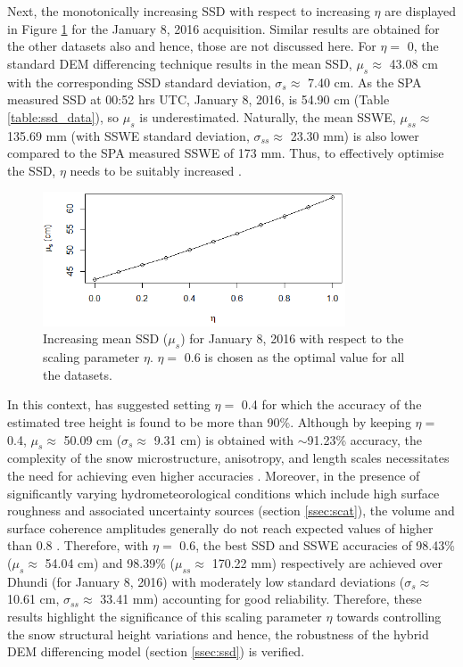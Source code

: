 \documentclass[12pt]{elsarticle}
\numberwithin{equation}{section}
\numberwithin{figure}{section}
\numberwithin{table}{section}
\begin{document}
Next, the monotonically increasing SSD with respect to increasing $\eta$ are displayed in Figure \ref{fig:eta} for the January 8, 2016 acquisition. Similar results are obtained for the other datasets also and hence, those are not discussed here. For $\eta =$ 0, the standard DEM differencing technique \citep{Cloude2005} results in the mean SSD, $\mu_s \approx$ 43.08 cm with the corresponding SSD standard deviation, $\sigma_s \approx$ 7.40 cm. As the SPA measured SSD at 00:52 hrs UTC, January 8, 2016, is 54.90 cm (Table \ref{table:ssd_data}), so $\mu_s$ is underestimated. Naturally, the mean SSWE, $\mu_{ss} \approx$ 135.69 mm (with SSWE standard deviation, $\sigma_{ss} \approx$ 23.30 mm) is also lower compared to the SPA measured SSWE of 173 mm. Thus, to effectively optimise the SSD, $\eta$ needs to be suitably increased \citep{Cloude2005, Cloude2010}.

\begin{figure}[htb]
    \centering
    \includegraphics[width=0.8\textwidth]{Figures/Results/Eta.png}
    \caption{\doublespacing Increasing mean SSD ($\mu_s$) for January 8, 2016 with respect to the scaling parameter $\eta$. $\eta =$ 0.6 is chosen as the optimal value for all the datasets.}
    \label{fig:eta}
\end{figure}

In this context, \cite{Cloude2005} has suggested setting $\eta = $ 0.4 for which the accuracy of the estimated tree height is found to be more than 90\%. Although by keeping $\eta = $ 0.4, $\mu_s \approx$ 50.09 cm ($\sigma_s \approx$ 9.31 cm) is obtained with $\sim$91.23\% accuracy, the complexity of the snow microstructure, anisotropy, and length scales necessitates the need for achieving even higher accuracies \citep{Leinss2016}. Moreover, in the presence of significantly varying hydrometeorological conditions which include high surface roughness and associated uncertainty sources (section \ref{ssec:scat}), the volume and surface coherence amplitudes generally do not reach expected values of higher than 0.8 \citep{Cloude2005, Kugler2015}. Therefore, with $\eta = $ 0.6, the best SSD and SSWE accuracies of 98.43\% ($\mu_s \approx$ 54.04 cm) and 98.39\% ($\mu_{ss} \approx$ 170.22 mm) respectively are achieved over Dhundi (for January 8, 2016) with moderately low standard deviations ($\sigma_s \approx$ 10.61 cm, $\sigma_{ss} \approx$ 33.41 mm) accounting for good reliability. Therefore, these results highlight the significance of this scaling parameter $\eta$ towards controlling the snow structural height variations \citep{Cloude2005, Cloude2010} and hence, the robustness of the hybrid DEM differencing model (section \ref{ssec:ssd}) is verified.
\end{document}
